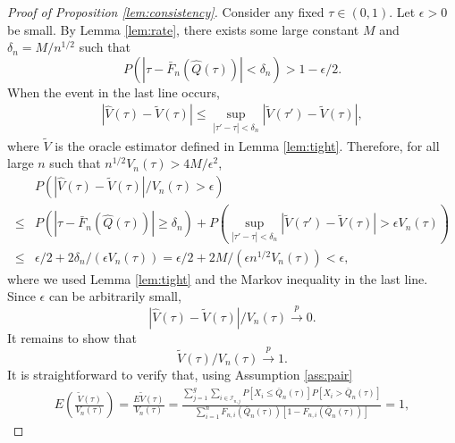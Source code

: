 \documentclass[12pt]{article}
\theoremstyle{remark}
\newcommand{\p}{P}
\renewcommand{\sqrt}[1]{#1^{1/2}}
\begin{document}
\begin{proof}[Proof of Proposition \ref{lem:consistency}]
	Consider any fixed $\tau\in (0,1)$. Let $\epsilon>0$ be small. By Lemma \ref{lem:rate}, there exists some large constant $M$ and $\delta_n=M/\sqrt{n}$ such that
	\begin{equation*}
		\p\left(|\tau-\bar{F}_n(\widehat{Q}(\tau))|<\delta_n\right)>1-\epsilon/2.
	\end{equation*}
	When the event in the last line occurs,  
	\begin{align*}
		\left|\widehat{V}(\tau)-\widetilde{V}(\tau)\right|
		\leq \sup_{|\tau'-\tau|<\delta_n}\left|\widetilde{V}(\tau')-\widetilde{V}(\tau)\right|,
	\end{align*}
	where $\widetilde{V}$ is the oracle estimator defined in Lemma \ref{lem:tight}. Therefore, for all large $n$ such that $\sqrt{n}V_n(\tau)>4M/\epsilon^2 $,
	\begin{align*}
		&\p\left(\left|\widehat{V}(\tau)-\widetilde{V}(\tau)\right|/V_n(\tau)>\epsilon \right)\\
		\leq&\p\left(|\tau-\bar{F}_n(\widehat{Q}(\tau))|\geq \delta_n\right)
		+\p\left(\sup_{|\tau'-\tau|<\delta_n}\left|\widetilde{V}(\tau')-\widetilde{V}(\tau)\right|>\epsilon V_n(\tau)\right)\\
		\leq&\epsilon/2+2\delta_n/(\epsilon V_n(\tau))
		=\epsilon/2+2M/(\epsilon \sqrt{n}V_n(\tau))<\epsilon,
	\end{align*}
	where we used Lemma \ref{lem:tight} and the Markov inequality in the last line. Since $\epsilon$ can be arbitrarily small,
	\begin{equation*}
		\left|\widehat{V}(\tau)-\widetilde{V}(\tau)\right|/V_n(\tau)\xrightarrow{p}0.
	\end{equation*}
	It remains to show that
	\begin{equation}\label{eqn:consistency}
		\widetilde{V}(\tau)/V_n(\tau)\xrightarrow{p}1.
	\end{equation}
	It is straightforward to verify that, using Assumption \ref{ass:pair}
	\begin{align*}
		E\left( \frac{\widetilde{V}(\tau)}{V_n(\tau)}\right) 
		=\frac{E\widetilde{V}(\tau)}{V_n(\tau)}
		=\frac{\sum_{j=1}^{g}\sum_{i\in \mathcal{I}_{n,j}}\p\left[ X_{i}\leq \bar{Q}_{n}(\tau)\right]
			\p\left[ X_{i}>\bar{Q}_{n}(\tau)\right]}{\sum_{i=1}^{n}F_{n,i}(\bar{Q}_{n}(\tau))
			[1-F_{n,i}(\bar{Q}_{n}(\tau))]}
		=1,
	\end{align*}


\end{proof}
\end{document}
